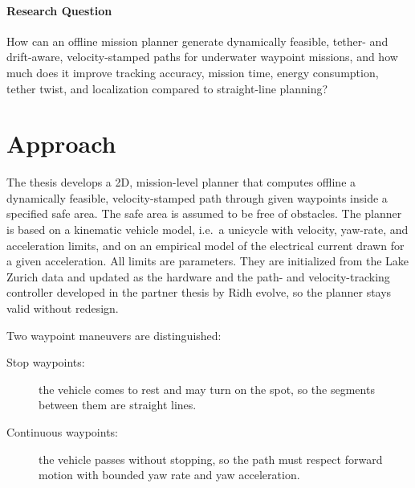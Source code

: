 \documentclass[article,notoc]{IDSCreport}
\begin{document}
\paragraph{Research Question} How can an offline mission planner generate
dynamically feasible, tether- and drift-aware, velocity-stamped paths for
underwater waypoint missions, and how much does it improve tracking accuracy,
mission time, energy consumption, tether twist, and localization compared to
straight-line planning?

\section{Approach}
\label{sec:Approach}

The thesis develops a 2D, mission-level planner that computes offline a
dynamically feasible, velocity-stamped path through given waypoints inside a
specified safe area. The safe area is assumed to be free of obstacles. The
planner is based on a kinematic vehicle model, i.e.\ a unicycle with velocity,
yaw-rate, and acceleration limits, and on an empirical model of the electrical
current drawn for a given acceleration. All limits are parameters. They are
initialized from the Lake Zurich data and updated as the hardware and the
path- and velocity-tracking controller developed in the partner thesis by Ridh
evolve, so the planner stays valid without redesign.

Two waypoint maneuvers are distinguished:
\begin{description}
    \item[Stop waypoints:] the vehicle comes to rest and may turn on the
          spot, so the segments between them are straight lines.
    \item[Continuous waypoints:] the vehicle passes without stopping, so
          the path must respect forward motion with bounded yaw rate and yaw
          acceleration.
\end{description}
\end{document}
